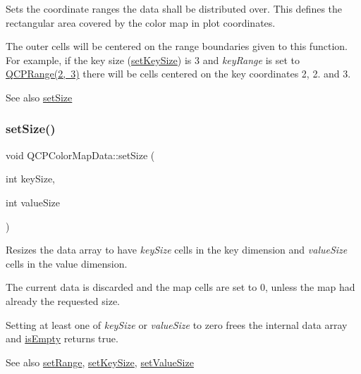 Sets the coordinate ranges the data shall be distributed over. This defines the rectangular area covered by the color map in plot coordinates.

The outer cells will be centered on the range boundaries given to this function. For example, if the key size (\mbox{\hyperlink{class_q_c_p_color_map_data_ac7ef70e383aface34b44dbde49234b6b}{set\+Key\+Size}}) is 3 and {\itshape key\+Range} is set to {\ttfamily \mbox{\hyperlink{class_q_c_p_range}{Q\+C\+P\+Range(2, 3)}}} there will be cells centered on the key coordinates 2, 2. and 3.

\begin{DoxySeeAlso}{See also}
\mbox{\hyperlink{class_q_c_p_color_map_data_a0d9ff35c299d0478b682bfbcdd9c097e}{set\+Size}} 
\end{DoxySeeAlso}
\mbox{\label{class_q_c_p_color_map_data_a0d9ff35c299d0478b682bfbcdd9c097e}} 
\subsubsection{\texorpdfstring{set\+Size()}{setSize()}}
{\footnotesize\ttfamily void Q\+C\+P\+Color\+Map\+Data\+::set\+Size (\begin{DoxyParamCaption}\item[{int}]{key\+Size,  }\item[{int}]{value\+Size }\end{DoxyParamCaption})}

Resizes the data array to have {\itshape key\+Size} cells in the key dimension and {\itshape value\+Size} cells in the value dimension.

The current data is discarded and the map cells are set to 0, unless the map had already the requested size.

Setting at least one of {\itshape key\+Size} or {\itshape value\+Size} to zero frees the internal data array and \mbox{\hyperlink{class_q_c_p_color_map_data_aea88cc75a76ca571acf29b2ba8ac970d}{is\+Empty}} returns true.

\begin{DoxySeeAlso}{See also}
\mbox{\hyperlink{class_q_c_p_color_map_data_aad9c1c7c703c1339489fc730517c83d4}{set\+Range}}, \mbox{\hyperlink{class_q_c_p_color_map_data_ac7ef70e383aface34b44dbde49234b6b}{set\+Key\+Size}}, \mbox{\hyperlink{class_q_c_p_color_map_data_a0893c9e3914513048b45e3429ffd16f2}{set\+Value\+Size}} 
\end{DoxySeeAlso}
\mbox{\label{class_q_c_p_color_map_data_ada1b2680ba96a5f4175b6d341cf75d23}} 
